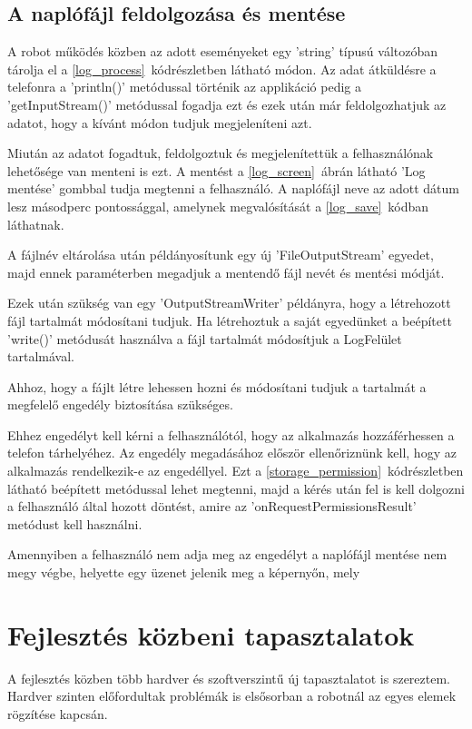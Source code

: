 \documentclass[]{thesis-ekf}
\theoremstyle{definition}
\begin{document}
\section{A naplófájl feldolgozása és mentése}
A robot működés közben az adott eseményeket egy 'string' típusú változóban tárolja el a \ref{log_process}~kódrészletben látható módon. Az adat átküldésre a telefonra a 'println()' metódussal történik az applikáció pedig a 'getInputStream()' metódussal fogadja ezt és ezek után már feldolgozhatjuk az adatot, hogy a kívánt módon tudjuk megjeleníteni azt.


Miután az adatot fogadtuk, feldolgoztuk és megjelenítettük a felhasználónak lehetősége van menteni is ezt. A mentést a \ref{log_screen}~ábrán látható 'Log mentése' gombbal tudja megtenni a felhasználó. A naplófájl neve az adott dátum lesz másodperc pontossággal, amelynek megvalósítását a \ref{log_save}~kódban láthatnak.

A fájlnév eltárolása után példányosítunk egy új 'FileOutputStream' egyedet, majd ennek paraméterben megadjuk a mentendő fájl nevét és mentési módját.

Ezek után szükség van egy 'OutputStreamWriter' példányra, hogy a létrehozott fájl tartalmát módosítani tudjuk. Ha létrehoztuk a saját egyedünket a beépített 'write()' metódusát használva a fájl tartalmát módosítjuk a LogFelület tartalmával.


Ahhoz, hogy a fájlt létre lehessen hozni és módosítani tudjuk a tartalmát a megfelelő engedély biztosítása szükséges.

Ehhez engedélyt kell kérni a felhasználótól, hogy az alkalmazás hozzáférhessen a telefon tárhelyéhez. Az engedély megadásához először ellenőriznünk kell, hogy az alkalmazás rendelkezik-e az engedéllyel. Ezt a \ref{storage_permission}~kódrészletben látható beépített metódussal lehet megtenni, majd a kérés után fel is kell dolgozni a felhasználó által hozott döntést, amire az 'onRequestPermissionsResult' metódust kell használni.

Amennyiben a felhasználó nem adja meg az engedélyt a naplófájl mentése nem megy végbe, helyette egy üzenet jelenik meg a képernyőn, mely 

\chapter{Fejlesztés közbeni tapasztalatok}
A fejlesztés közben több hardver és szoftverszintű új tapasztalatot is szereztem. Hardver szinten előfordultak problémák is elsősorban a robotnál az egyes elemek rögzítése kapcsán.
\end{document}
